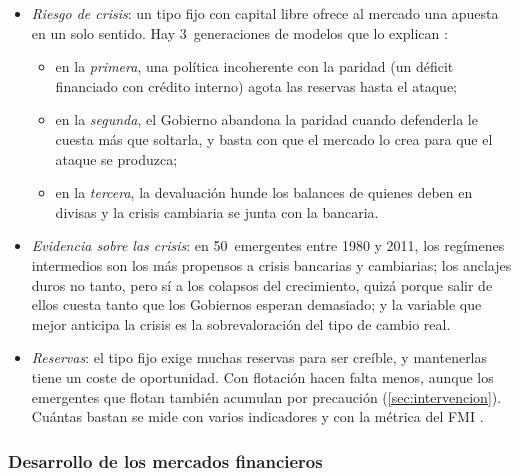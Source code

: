 \documentclass[11pt]{article}
\begin{document}
\begin{itemize}
\begin{itemize}
  \end{itemize}
\item \emph{Riesgo de crisis}: un tipo fijo con capital libre ofrece al mercado una apuesta en un solo sentido. Hay 3~generaciones de modelos que lo explican :
  \begin{itemize}
  \item en la \emph{primera}, una política incoherente con la paridad (un déficit financiado con crédito interno) agota las reservas hasta el ataque\nocite{Krugman1979Model};
  \item en la \emph{segunda}, el Gobierno abandona la paridad cuando defenderla le cuesta más que soltarla, y basta con que el mercado lo crea para que el ataque se produzca;
  \item en la \emph{tercera}, la devaluación hunde los balances de quienes deben en divisas y la crisis cambiaria se junta con la bancaria.
  \end{itemize}
\item \emph{Evidencia sobre las crisis}: en 50~emergentes entre 1980 y 2011, los regímenes intermedios son los más propensos a crisis bancarias y cambiarias; los anclajes duros no tanto, pero sí a los colapsos del crecimiento, quizá porque salir de ellos cuesta tanto que los Gobiernos esperan demasiado; y la variable que mejor anticipa la crisis es la sobrevaloración del tipo de cambio real\nocite{GhoshOstryQureshi2015}.
\item \emph{Reservas}: el tipo fijo exige muchas reservas para ser creíble, y mantenerlas tiene un coste de oportunidad. Con flotación hacen falta menos, aunque los emergentes que flotan también acumulan por precaución (\ref{sec:intervencion}). Cuántas bastan se mide con varios indicadores y con la métrica del FMI .
\end{itemize}

\subsubsection{Desarrollo de los mercados financieros}\label{sec:mercados-financieros}
\end{document}
